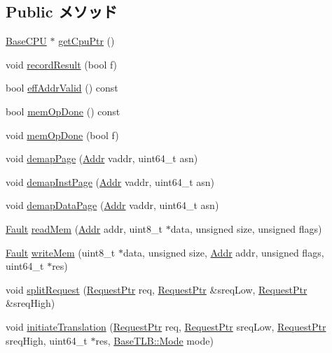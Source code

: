 \subsection*{Public メソッド}
\begin{DoxyCompactItemize}
\item 
\hyperlink{classBaseCPU}{BaseCPU} $\ast$ \hyperlink{classBaseDynInst_a4f35ce7d5cb2ec57504bc2c2bc03c879}{getCpuPtr} ()
\item 
void \hyperlink{classBaseDynInst_a2873e4a3f13a6eced648f00776dde834}{recordResult} (bool f)
\item 
bool \hyperlink{classBaseDynInst_a3e8dc2f81466d2399695ce78aba506da}{effAddrValid} () const 
\item 
bool \hyperlink{classBaseDynInst_ab5d452060f2b5236af48329f3b21b250}{memOpDone} () const 
\item 
void \hyperlink{classBaseDynInst_a8febf5a926e063e10aed0215d0a0fcaf}{memOpDone} (bool f)
\item 
void \hyperlink{classBaseDynInst_a2d698ff909513b48a1263f8a5440e067}{demapPage} (\hyperlink{base_2types_8hh_af1bb03d6a4ee096394a6749f0a169232}{Addr} vaddr, uint64\_\-t asn)
\item 
void \hyperlink{classBaseDynInst_ac8a36d45a839b07f50b73f1eee119615}{demapInstPage} (\hyperlink{base_2types_8hh_af1bb03d6a4ee096394a6749f0a169232}{Addr} vaddr, uint64\_\-t asn)
\item 
void \hyperlink{classBaseDynInst_a26789603cc94992d18f8ddedfff96acf}{demapDataPage} (\hyperlink{base_2types_8hh_af1bb03d6a4ee096394a6749f0a169232}{Addr} vaddr, uint64\_\-t asn)
\item 
\hyperlink{classRefCountingPtr}{Fault} \hyperlink{classBaseDynInst_a66191b2d8a45050b7df3c3efa7bb07c6}{readMem} (\hyperlink{base_2types_8hh_af1bb03d6a4ee096394a6749f0a169232}{Addr} addr, uint8\_\-t $\ast$data, unsigned size, unsigned flags)
\item 
\hyperlink{classRefCountingPtr}{Fault} \hyperlink{classBaseDynInst_ad46c5edeb1ee9b60445f3e26364e2c5e}{writeMem} (uint8\_\-t $\ast$data, unsigned size, \hyperlink{base_2types_8hh_af1bb03d6a4ee096394a6749f0a169232}{Addr} addr, unsigned flags, uint64\_\-t $\ast$res)
\item 
void \hyperlink{classBaseDynInst_aa1b0c0798d6520eb2c1bf3334cee01c5}{splitRequest} (\hyperlink{classRequest}{RequestPtr} req, \hyperlink{classRequest}{RequestPtr} \&sreqLow, \hyperlink{classRequest}{RequestPtr} \&sreqHigh)
\item 
void \hyperlink{classBaseDynInst_ae5c08b83b54ab954feb02df3e206c1f0}{initiateTranslation} (\hyperlink{classRequest}{RequestPtr} req, \hyperlink{classRequest}{RequestPtr} sreqLow, \hyperlink{classRequest}{RequestPtr} sreqHigh, uint64\_\-t $\ast$res, \hyperlink{classBaseTLB_a46c8a310cf4c094f8c80e1cb8dc1f911}{BaseTLB::Mode} mode)

\end{DoxyCompactItemize}
